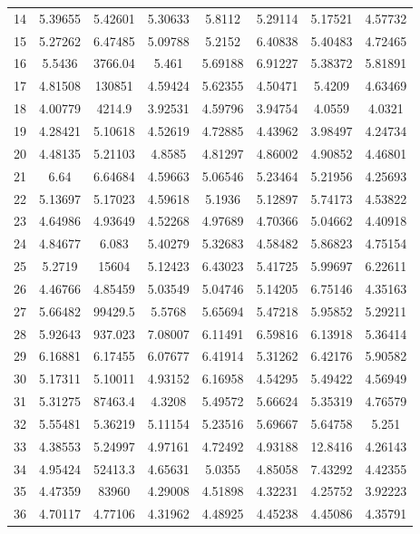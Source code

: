 \begin{center}
\begin{longtable}{cccccccc}
14 & 5.39655 & 5.42601 & 5.30633 & 5.8112 & 5.29114 & 5.17521 & 4.57732\\
15 & 5.27262 & 6.47485 & 5.09788 & 5.2152 & 6.40838 & 5.40483 & 4.72465\\
16 & 5.5436 & 3766.04 & 5.461 & 5.69188 & 6.91227 & 5.38372 & 5.81891\\
17 & 4.81508 & 130851 & 4.59424 & 5.62355 & 4.50471 & 5.4209 & 4.63469\\
18 & 4.00779 & 4214.9 & 3.92531 & 4.59796 & 3.94754 & 4.0559 & 4.0321\\
19 & 4.28421 & 5.10618 & 4.52619 & 4.72885 & 4.43962 & 3.98497 & 4.24734\\
20 & 4.48135 & 5.21103 & 4.8585 & 4.81297 & 4.86002 & 4.90852 & 4.46801\\
21 & 6.64 & 6.64684 & 4.59663 & 5.06546 & 5.23464 & 5.21956 & 4.25693\\
22 & 5.13697 & 5.17023 & 4.59618 & 5.1936 & 5.12897 & 5.74173 & 4.53822\\
23 & 4.64986 & 4.93649 & 4.52268 & 4.97689 & 4.70366 & 5.04662 & 4.40918\\
24 & 4.84677 & 6.083 & 5.40279 & 5.32683 & 4.58482 & 5.86823 & 4.75154\\
25 & 5.2719 & 15604 & 5.12423 & 6.43023 & 5.41725 & 5.99697 & 6.22611\\
26 & 4.46766 & 4.85459 & 5.03549 & 5.04746 & 5.14205 & 6.75146 & 4.35163\\
27 & 5.66482 & 99429.5 & 5.5768 & 5.65694 & 5.47218 & 5.95852 & 5.29211\\
28 & 5.92643 & 937.023 & 7.08007 & 6.11491 & 6.59816 & 6.13918 & 5.36414\\
29 & 6.16881 & 6.17455 & 6.07677 & 6.41914 & 5.31262 & 6.42176 & 5.90582\\
30 & 5.17311 & 5.10011 & 4.93152 & 6.16958 & 4.54295 & 5.49422 & 4.56949\\
31 & 5.31275 & 87463.4 & 4.3208 & 5.49572 & 5.66624 & 5.35319 & 4.76579\\
32 & 5.55481 & 5.36219 & 5.11154 & 5.23516 & 5.69667 & 5.64758 & 5.251\\
33 & 4.38553 & 5.24997 & 4.97161 & 4.72492 & 4.93188 & 12.8416 & 4.26143\\
34 & 4.95424 & 52413.3 & 4.65631 & 5.0355 & 4.85058 & 7.43292 & 4.42355\\
35 & 4.47359 & 83960 & 4.29008 & 4.51898 & 4.32231 & 4.25752 & 3.92223\\
36 & 4.70117 & 4.77106 & 4.31962 & 4.48925 & 4.45238 & 4.45086 & 4.35791\\

\end{longtable}
\end{center}
